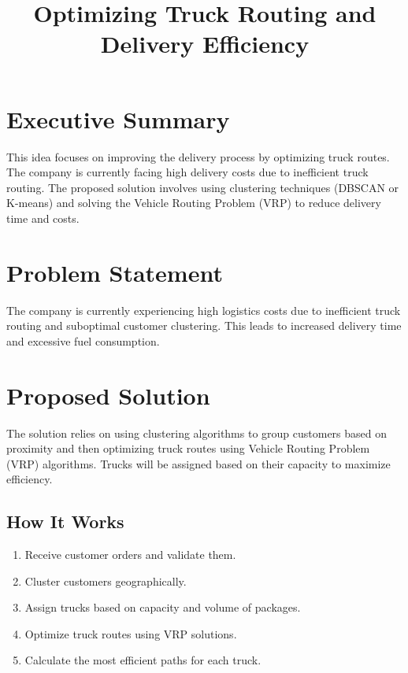 \documentclass[a4paper,12pt, final]{article}
\title{Optimizing Truck Routing and Delivery Efficiency}
\begin{document}
\placelastupdatedtext
\maketitle

\tableofcontents

\section{Executive Summary}
This idea focuses on improving the delivery process by optimizing truck routes. The company is
currently facing high delivery costs due to inefficient truck routing.
The proposed solution involves using clustering techniques (DBSCAN or K-means) and solving the
Vehicle Routing Problem (VRP) to reduce delivery time and costs.

\section{Problem Statement}
The company is currently experiencing high logistics costs due to inefficient truck routing and
suboptimal customer clustering. This leads to increased delivery time and excessive fuel
consumption.

\section{Proposed Solution}
The solution relies on using clustering algorithms to group customers based on proximity and then
optimizing truck routes using Vehicle Routing Problem (VRP) algorithms. Trucks will be assigned
based on their capacity to maximize efficiency.

\subsection{How It Works}
\begin{enumerate}
    \item Receive customer orders and validate them.
    \item Cluster customers geographically.
    \item Assign trucks based on capacity and volume of packages.
    \item Optimize truck routes using VRP solutions.
    \item Calculate the most efficient paths for each truck.
\end{enumerate}
\end{document}
